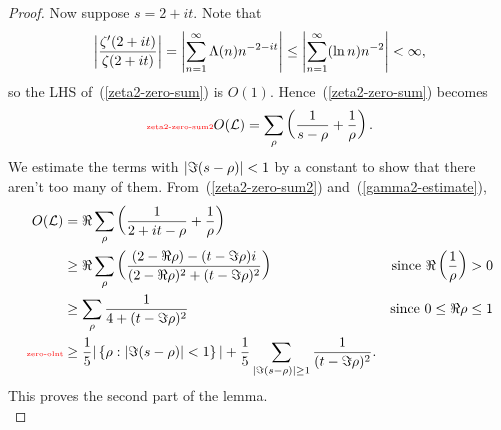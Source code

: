 \begin{proof}
Now suppose $s=2+it$. %
Note that
\[
\left| {\frac{\zeta'(2+it)}{\zeta(2+it)}} \right|
=\left| {\sum_{n=1}^{\infty} \Lambda(n)n^{-2-it}} \right|
\le \left| {\sum_{n=1}^{\infty} (\ln n)n^{-2}} \right|<\infty,
\]
so the LHS of~(\ref{zeta2-zero-sum}) is $O(1)$.
Hence~(\ref{zeta2-zero-sum}) becomes
\begin{equation}\llabel{zeta2-zero-sum2}
O(\cal L)=\sum_{\rh} \pa{\rc{%
s-\rh}+\rc{\rh}}.
\end{equation}
We estimate the terms with $|\Im(s-\rho)|<1$ by a constant to show that there aren't too many of them.
From~(\ref{zeta2-zero-sum2}) and~(\ref{gamma2-estimate}),
\begin{align}
%
\nonumber
O(\cal L) &= \Re\sum_{\rh}\pa{\rc{2+it-\rh}+\rc{\rh}}\\
\nonumber
&\ge
\Re\sum_{\rh}\pa{
\frac{(2-\Re \rh)-(t-\Im \rh)i}{(2-\Re \rh)^2+(t-\Im\rh)^2}
}&\text{since }\Re \prc{\rh}>0\\
\nonumber
&\ge\sum_{\rh} \rc{4+(t-\Im \rh)^2}&\text{since $0\le \Re \rh\le 1$}\\
\llabel{zero-olnt}
&\ge \rc 5 |\set{\rh}{|\Im(s-\rh)|<1}|+\rc5 \sum_{|\Im(s-\rh)|\ge 1}\rc{(t-\Im \rh)^2}.
\end{align}
This proves the second part of the lemma.\\


\end{proof}

